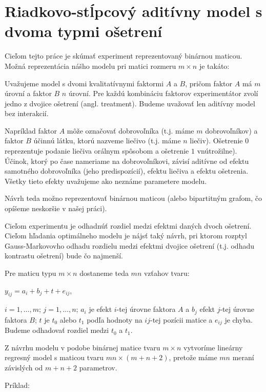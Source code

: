 \section{Riadkovo-stĺpcový aditívny model s dvoma typmi ošetrení}
\label{my model}

Cieľom tejto práce je skúmať experiment reprezentovaný binárnou maticou.
Možná reprezentácia nášho modelu pri matici rozmeru $m \times n$ je takáto:

Uvažujeme model s dvomi kvalitatívnymi faktormi $A$ a $B$, 
pričom faktor $A$ má $m$ úrovní a faktor $B$ $n$ úrovní. 
Pre každú kombináciu faktorov experimentátor zvolí jedno z dvojice ošetrení (angl. treatment).
Budeme uvažovať len aditívny model bez interakcií.

Napríklad faktor $A$ môže označovať dobrovoľníka (t.j. máme $m$ dobrovoľníkov) 
a faktor $B$ účinnú látku, ktorú nazveme liečivo (t.j. máme $n$ liečiv). 
Ošetrenie $0$ reprezentuje podanie liečiva orálnym spôsobom a ošetrenie $1$ vnútrožilne).
Účinok, ktorý po čase nameriame na dobrovoľníkovi, 
závisí aditívne od efektu samotného dobrovoľníka (jeho predispozícií), 
efektu liečiva a efektu ošetrenia. 
Všetky tieto efekty uvažujeme ako neznáme parametere modelu.

Návrh teda možno reprezentovať binárnou maticou 
(alebo bipartitným grafom, čo opíšeme neskoršie v našej práci).

Cieľom experimentu je odhadnúť rozdiel medzi efektmi daných dvoch ošetrení.
Cieľom hľadania optimálneho modelu je nájsť taký návrh, pri ktorom
rozptyl Gauss-Markovovho odhadu rozdielu medzi efektmi dvojice ošetrení (t.j. odhadu kontrastu ošetrení) bude čo najmenší.

Pre maticu typu $m \times n$ dostaneme teda $mn$ vzťahov tvaru:

\begin{center}
$
y_{ij} = a_i + b_j + t + e_{ij}
$,
\end{center}

$i = 1, \ldots, m$; $j = 1, \ldots, n$; $a_i$ je efekt $i$-tej úrovne faktora $A$ a $b_j$ efekt $j$-tej úrovne faktora $B$; $t$ je $t_0$ alebo $t_1$ podľa hodnoty na $ij$-tej pozícii matice a $e_{ij}$ je chyba.
Budeme odhadovať rozdiel medzi $t_0$ a $t_1$.

Z návrhu modelu v podobe binárnej matice tvaru $m \times n$ vytvoríme lineárny regresný model
s maticou tvaru $mn \times (m + n + 2)$, pretože máme $mn$ meraní závislých od $m + n + 2$ parametrov.

Príklad:

